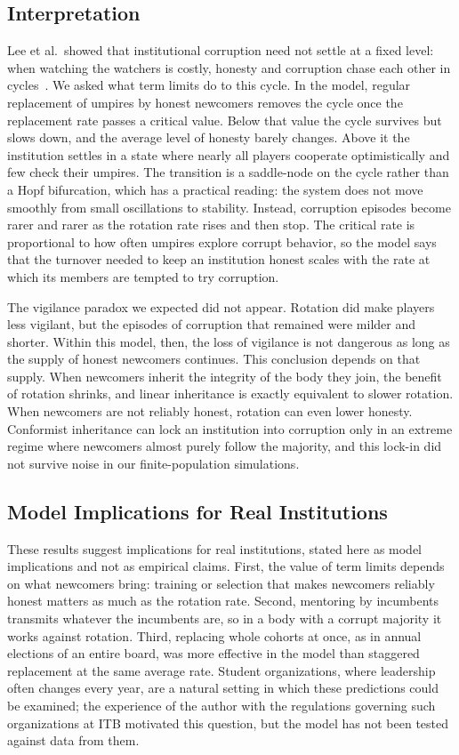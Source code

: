 \documentclass[journal]{IEEEtran}
\begin{document}
\subsection{Interpretation}
Lee et al.\ showed that institutional corruption need not settle at a fixed level: when watching
the watchers is costly, honesty and corruption chase each other in cycles~\cite{lee2019social}. We
asked what term limits do to this cycle. In the model, regular replacement of umpires by honest
newcomers removes the cycle once the replacement rate passes a critical value. Below that value
the cycle survives but slows down, and the average level of honesty barely changes. Above it the
institution settles in a state where nearly all players cooperate optimistically and few check
their umpires. The transition is a saddle-node on the cycle rather than a Hopf bifurcation, which
has a practical reading: the system does not move smoothly from small oscillations to stability.
Instead, corruption episodes become rarer and rarer as the rotation rate rises and then stop. The
critical rate is proportional to how often umpires explore corrupt behavior, so the model says
that the turnover needed to keep an institution honest scales with the rate at which its members
are tempted to try corruption.

The vigilance paradox we expected did not appear. Rotation did make players less vigilant, but
the episodes of corruption that remained were milder and shorter. Within this model, then, the
loss of vigilance is not dangerous as long as the supply of honest newcomers continues. This
conclusion depends on that supply. When newcomers inherit the integrity of the body they join, the
benefit of rotation shrinks, and linear inheritance is exactly equivalent to slower rotation. When
newcomers are not reliably honest, rotation can even lower honesty. Conformist inheritance can
lock an institution into corruption only in an extreme regime where newcomers almost purely follow
the majority, and this lock-in did not survive noise in our finite-population simulations.

\subsection{Model Implications for Real Institutions}
These results suggest implications for real institutions, stated here as model implications and
not as empirical claims. First, the value of term limits depends on what newcomers bring:
training or selection that makes newcomers reliably honest matters as much as the rotation rate.
Second, mentoring by incumbents transmits whatever the incumbents are, so in a body with a corrupt
majority it works against rotation. Third, replacing whole cohorts at once, as in annual elections
of an entire board, was more effective in the model than staggered replacement at the same
average rate. Student organizations, where leadership often changes every year, are a natural
setting in which these predictions could be examined; the experience of the author with the
regulations governing such organizations at ITB motivated this question, but the model has not
been tested against data from them.
\end{document}
